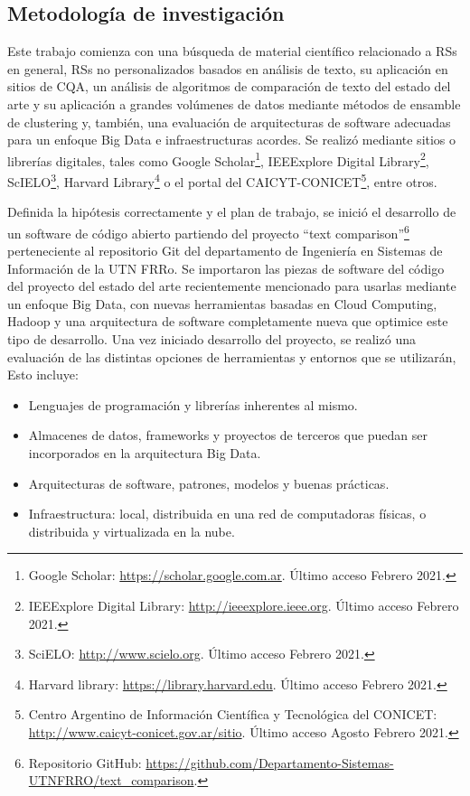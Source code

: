 \subsection{Metodología de investigación}
Este trabajo comienza con una búsqueda de material científico relacionado a RSs en general, RSs no personalizados basados en análisis de texto, su aplicación en sitios de CQA, un análisis de algoritmos de comparación de texto del estado del arte y su aplicación a grandes volúmenes de datos mediante métodos de ensamble de clustering y, también, una evaluación de arquitecturas de software adecuadas para un enfoque Big Data e infraestructuras acordes. Se realizó mediante sitios o librerías digitales, tales como Google Scholar\footnote{Google Scholar: \url{https://scholar.google.com.ar}. Último acceso Febrero 2021.}, IEEExplore Digital Library\footnote{IEEExplore Digital Library: \url{http://ieeexplore.ieee.org}. Último acceso Febrero 2021.}, ScIELO\footnote{SciELO: \url{http://www.scielo.org}. Último acceso Febrero 2021.}, Harvard Library\footnote{Harvard library: \url{https://library.harvard.edu}. Último acceso Febrero 2021.} o el portal del CAICYT-CONICET\footnote{Centro Argentino de Información Científica y Tecnológica del CONICET: \url{http://www.caicyt-conicet.gov.ar/sitio}. Último acceso Agosto Febrero 2021.}, entre otros.

\bigskip Definida la hipótesis correctamente y el plan de trabajo, se inició el desarrollo de un software de código abierto partiendo del proyecto ``text comparison''\footnote{Repositorio GitHub: \url{https://github.com/Departamento-Sistemas-UTNFRRO/text_comparison}.} perteneciente al repositorio Git del departamento de Ingeniería en Sistemas de Información de la UTN FRRo. Se importaron las piezas de software del código del proyecto del estado del arte recientemente mencionado para usarlas mediante un enfoque Big Data, con nuevas herramientas basadas en Cloud Computing, Hadoop y una arquitectura de software completamente nueva que optimice este tipo de desarrollo. Una vez iniciado desarrollo del proyecto, se realizó una evaluación de las distintas opciones de herramientas y entornos que se utilizarán, Esto incluye:

\begin{itemize}
	\item Lenguajes de programación y librerías inherentes al mismo.
	\item Almacenes de datos, frameworks y proyectos de terceros que puedan ser incorporados en la arquitectura Big Data.
	\item Arquitecturas de software, patrones, modelos y buenas prácticas.
	\item Infraestructura: local, distribuida en una red de computadoras físicas, o distribuida y virtualizada en la nube.
\end{itemize}

